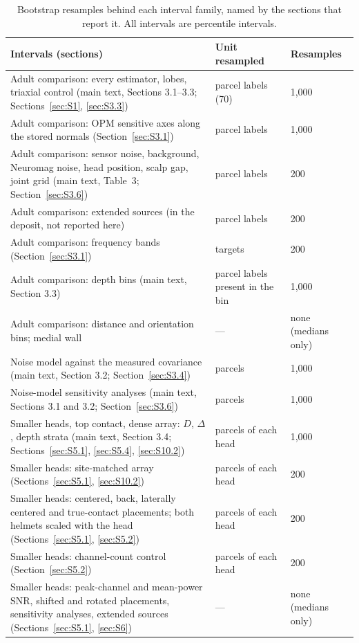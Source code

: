 \documentclass[preprint,12pt,authoryear,a4paper]{elsarticle}
\begin{document}
\begin{table}[tbp]
\caption{Bootstrap resamples behind each interval family, named by the sections that report it. All intervals are percentile intervals.}\label{tab:S16}
\centering\footnotesize
\begin{tabularx}{\textwidth}{YL{0.3\textwidth}L{0.15\textwidth}}
\toprule
Intervals (sections) & Unit resampled & Resamples \\
\midrule
Adult comparison: every estimator, lobes, triaxial control (main text, Sections 3.1--3.3; Sections~\ref{sec:S1}, \ref{sec:S3.3}) & parcel labels (70) & 1,000 \\
Adult comparison: OPM sensitive axes along the stored normals (Section~\ref{sec:S3.1}) & parcel labels & 1,000 \\
Adult comparison: sensor noise, background, Neuromag noise, head position, scalp gap, joint grid (main text, Table~3; Section~\ref{sec:S3.6}) & parcel labels & 200 \\
Adult comparison: extended sources (in the deposit, not reported here) & parcel labels & 200 \\
Adult comparison: frequency bands (Section~\ref{sec:S3.1}) & targets & 200 \\
Adult comparison: depth bins (main text, Section 3.3) & parcel labels present in the bin & 1,000 \\
Adult comparison: distance and orientation bins; medial wall & --- & none (medians only) \\
Noise model against the measured covariance (main text, Section 3.2; Section~\ref{sec:S3.4}) & parcels & 1,000 \\
Noise-model sensitivity analyses (main text, Sections 3.1 and 3.2; Section~\ref{sec:S3.6}) & parcels & 1,000 \\
Smaller heads, top contact, dense array: $D$, $\Delta$, depth strata (main text, Section 3.4; Sections~\ref{sec:S5.1}, \ref{sec:S5.4}, \ref{sec:S10.2}) & parcels of each head & 1,000 \\
Smaller heads: site-matched array (Sections~\ref{sec:S5.1}, \ref{sec:S10.2}) & parcels of each head & 200 \\
Smaller heads: centered, back, laterally centered and true-contact placements; both helmets scaled with the head (Sections~\ref{sec:S5.1}, \ref{sec:S5.2}) & parcels of each head & 200 \\
Smaller heads: channel-count control (Section~\ref{sec:S5.2}) & parcels of each head & 200 \\
Smaller heads: peak-channel and mean-power SNR, shifted and rotated placements, sensitivity analyses, extended sources (Sections~\ref{sec:S5.1}, \ref{sec:S6}) & --- & none (medians only) \\

\end{tabularx}
\end{table}
\end{document}
